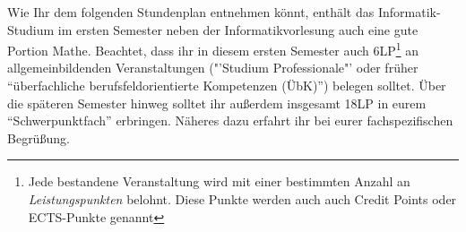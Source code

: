 Wie Ihr dem folgenden Stundenplan entnehmen könnt, enthält das Informatik-Studium im ersten
Semester neben der Informatikvorlesung auch eine gute Portion Mathe. Beachtet, dass ihr
in diesem ersten Semester auch 6LP\footnote{Jede bestandene Veranstaltung wird mit einer bestimmten Anzahl an \emph{Leistungspunkten} belohnt. Diese Punkte werden auch auch Credit Points oder ECTS-Punkte genannt} an allgemeinbildenden Veranstaltungen ("'Studium Professionale"' oder früher "`überfachliche berufsfeldorientierte Kompetenzen (ÜbK)"') belegen solltet.
Über die späteren Semester hinweg solltet ihr außerdem insgesamt 18LP in eurem "`Schwerpunktfach"' erbringen. Näheres dazu erfahrt ihr bei eurer fachspezifischen Begrüßung.


